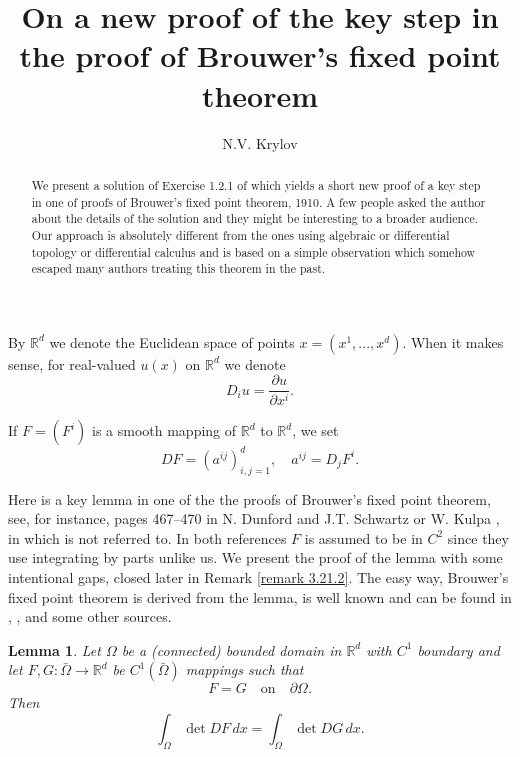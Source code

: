 \documentclass[11pt, reqno]{amsart}
\newtheorem{lemma}[theorem]{Lemma}
\theoremstyle{remark}
\theoremstyle{definition}
\newcommand\bR{\mathbb{R}}
\begin{document}
\title[Brouwer's fixed point theorem]
{On a new proof of the key step in the proof of Brouwer's fixed point theorem}

  
\author{N.V. Krylov}
 
\address{127 Vincent Hall, University of Minnesota,
 Minneapolis, MN, 55455}

 



 
\begin{abstract}
We present a solution of   Exercise 1.2.1 of \cite{Kr_08}
which yields a short new proof of a key step
in one of proofs of
Brouwer's fixed point theorem, 1910.
A few people asked the author about the details
of the solution and they might be interesting to a broader audience.
Our approach is absolutely different from
the ones using algebraic or differential topology or differential calculus and is
based on a simple observation which somehow
escaped many authors treating this theorem
in the past.

\end{abstract}


\maketitle
 

By $\bR^{d}$ we denote the Euclidean
space of points $x=(x^{1},...,x^{d})$. When it makes sense,
for real-valued $u(x)$ on $\bR^{d}$ we denote 
$$
D_{i}u =\frac{\partial u}{\partial x^{i}}.
$$
 
 
If $F=(F^{i})$ is a smooth mapping of $\bR^{d}$
to $\bR^{d}$, we set
$$
DF=(a^{ij} )_{i,j=1 }^{ d},\quad a^{ij}=D_{j}F^{i}.
$$

 
Here is a key   lemma in one of the the proofs 
of
Brouwer's fixed point theorem, see, for instance,
pages 467--470 in
N. Dunford and J.T. Schwartz \cite{DS_58} or  W. Kulpa \cite{Ku_89},
in which \cite{DS_58} is not referred to. In both references $F$ is assumed to be in $C^{2}$
since they use integrating by parts unlike us. We present
the proof of the lemma with  some intentional gaps, closed
later in   Remark \ref{remark 3.21.2}.
The easy way, Brouwer's fixed point theorem is derived from
the lemma, is well known and can be found in
\cite{DS_58}, \cite{Ku_89}, \cite{Kr_23} and some other sources.
\begin{lemma}
                           \label{lemma 3.21.1}
Let $\Omega$ be a (connected) bounded domain
in $\bR^{d}$
with $C^{1}$ boundary
and let $F, G:\bar\Omega\to\bR^{d}$ be  $C^{1}(\bar{\Omega} )$
mappings such that 
 $$
F=G\quad\text{on}\quad \partial \Omega.
 $$ 
Then
 $$
\int_{\Omega}\det D F\,dx=
\int_{\Omega}\det DG\,dx.
 $$

\end{lemma}
\end{document}
